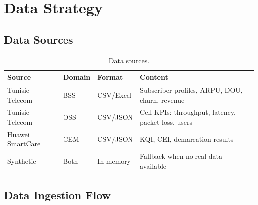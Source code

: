\documentclass[12pt,a4paper]{report}
\begin{document}
\chapter{Data Strategy}

\section{Data Sources}

\begin{table}[H]
\centering\small
\caption{Data sources.}
\begin{tabularx}{\textwidth}{@{}lllX@{}}
\toprule
\textbf{Source} & \textbf{Domain} & \textbf{Format} & \textbf{Content} \\
\midrule
Tunisie Telecom & BSS & CSV/Excel & Subscriber profiles, ARPU, DOU, churn, revenue \\
Tunisie Telecom & OSS & CSV/JSON  & Cell KPIs: throughput, latency, packet loss, users \\
Huawei SmartCare & CEM & CSV/JSON  & KQI, CEI, demarcation results \\
Synthetic       & Both & In-memory & Fallback when no real data available \\
\bottomrule
\end{tabularx}
\end{table}

\section{Data Ingestion Flow}
\end{document}
